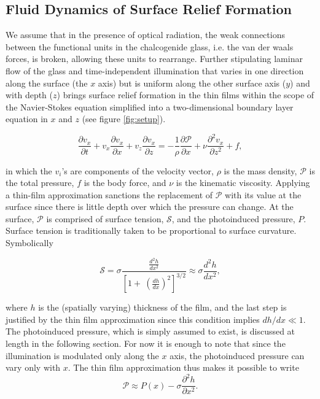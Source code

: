 \documentclass[aps, prl, twocolumn, groupedaddress]{revtex4-1}
\begin{document}
\subsection{Fluid Dynamics of Surface Relief Formation}
\label{sec:fluids}

We assume that in the presence of optical radiation, the weak
connections between the functional units in the chalcogenide glass,
i.e. the van der waals forces, is broken, allowing these units to
rearrange. Further stipulating laminar flow of the glass and
time-independent illumination that varies in one direction along the
surface (the $x$ axis) but is uniform along the other surface axis
($y$) and with depth ($z$) brings surface relief formation in the thin
films within the scope of the Navier-Stokes equation simplified into a
two-dimensional boundary layer equation in $x$ and $z$ \cite{levich}
(see figure \ref{fig:setup}).

\begin{equation}
\frac{\partial v_x}{\partial t}+v_x\frac{\partial v_x}{\partial x} +v_z\frac{\partial
v_x}{\partial z} = - \frac{1}{\rho}\frac{\partial \mathcal{P}}{\partial
x}+\nu\frac{\partial^2 v_x}{\partial z^2}+f \mathrm{,} \label{eq:levstokes}
\end{equation}

in which the $v_i$'s are components of the velocity vector, $\rho$ is
the mass density, $\mathcal{P}$ is the total pressure, $f$ is the body
force, and $\nu$ is the kinematic viscosity. Applying a thin-film
approximation sanctions the replacement of $\mathcal{P}$ with its
value at the surface since there is little depth over which the
pressure can change. At the surface, $\mathcal{P}$ is comprised of surface
tension, $\mathcal{S}$, and the photoinduced pressure, $P$. Surface
tension is traditionally taken to be proportional to surface
curvature. Symbolically

\begin{equation}
\mathcal{S}= \sigma \frac{\frac{d^2h}{dx^2}}{\left[1+\
\left(\frac{dh}{dx}\right)^2\right]^{3/2}}\approx \sigma \frac{d^2h}{dx^2} \mathrm{,}
\label{eq:surften}
\end{equation}


where $h$ is
the (spatially varying) thickness of the film, and the last step is
justified by the thin film approximation since this condition implies
$dh/dx\ll 1$. The photoinduced pressure, which is simply assumed to
exist, is discussed at length in the following section. For now
it is enough to note that since the illumination is modulated only
along the $x$ axis, the photoinduced pressure can vary only with
$x$. The thin film approximation thus makes it possible to write
\begin{equation}
\mathcal{P} \approx P(x)-\sigma\frac{\partial^2 h}{\partial x^2} \mathrm{.}
\end{equation}
\end{document}
